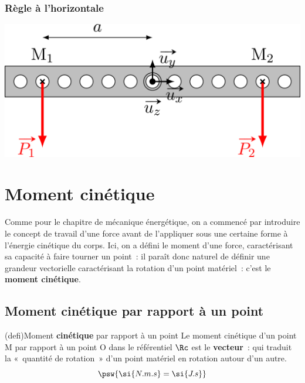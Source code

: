 \documentclass[../../main/main.tex]{subfiles}
\begin{document}
\subsubsection{Règle à l'horizontale}
\begin{isd}[lefthand ratio=.45]
	\begin{center}
		\includegraphics[scale=1]{moment_regle-a}
	\end{center}
	\tcblower
\end{isd}

\section{Moment cinétique}
Comme pour le chapitre de mécanique énergétique, on a commencé par introduire le
concept de travail d'une force avant de l'appliquer sous une certaine forme à
l'énergie cinétique du corps. Ici, on a défini le moment d'une force,
caractérisant sa capacité à faire tourner un point~: il paraît donc naturel de
définir une grandeur vectorielle caractérisant la rotation d'un point matériel~:
c'est le \textbf{moment cinétique}.

\subsection{Moment cinétique par rapport à un point}
\begin{tcb*}[sidebyside, righthand ratio=.2](defi){Moment \textbf{cinétique} par
			rapport à un point}
	Le moment cinétique d'un point M par rapport à un point O dans le
	référentiel $\Rc$ est le \textbf{vecteur}~:
	\psw{
		\[
			\boxed{\Lcf_{\Or/\Rc}(\Mr) = \OM\wedge\pf_{\Mr/\Rc} = \OM\wedge
				m\vf_{\Mr/\Rc}}
		\]
	}%
	qui traduit la «~quantité de rotation~» d'un point matériel en rotation
	autour d'un autre.
	\tcblower
	\[
		\psw{
			\si{N.m.s} = \si{J.s}
		}
	\]
\end{tcb*}
\end{document}
